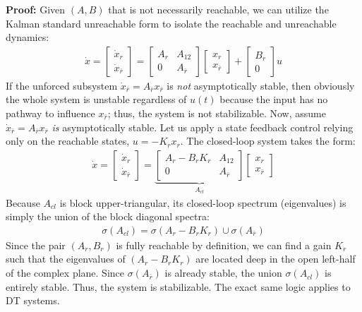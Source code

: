 \documentclass[twoside, 11pt, a4paper]{article}
\begin{document}
\textbf{Proof:} Given $(A,B)$ that is not necessarily reachable, we can utilize the Kalman standard unreachable form to isolate the reachable and unreachable dynamics:
%
\begin{align*}
\dot{x} = \left[ \begin{array}{c} \dot{x}_r \\ \dot{x}_{\bar{r}} \end{array} \right]  = \left[ \begin{array}{c|c} A_{r} & A_{12} \\ \hline 0 & A_{\bar{r}} \end{array} \right] \left[ \begin{array}{c} x_r \\ x_{\bar{r}} \end{array} \right]  
+ \left[ \begin{array}{c} B_r \\ 0 \end{array} \right] u
\end{align*}
%
If the unforced subsystem $\dot{x}_{\bar{r}} = A_{\bar{r}} x_{\bar{r}}$ is \textit{not} asymptotically stable, then obviously the whole system is unstable regardless of $u(t)$ because the input has no pathway to influence $x_{\bar{r}}$; thus, the system is not stabilizable.
%
Now, assume $\dot{x}_{\bar{r}} = A_{\bar{r}} x_{\bar{r}}$ \textit{is} asymptotically stable. Let us apply a state feedback control relying only on the reachable states, $u = - K_{r} x_{r}$. The closed-loop system takes the form:
%
\begin{align*}
\dot{x} = \left[ \begin{array}{c} \dot{x}_r \\ \dot{x}_{\bar{r}} \end{array} \right]  = \underbrace{\left[ \begin{array}{c|c} A_{r} - B_r K_r & A_{12} \\ \hline 0 & A_{\bar{r}} \end{array} \right]}_{A_{cl}} \left[ \begin{array}{c} x_r \\ x_{\bar{r}} \end{array} \right]  
\end{align*}
%
Because $A_{cl}$ is block upper-triangular, its closed-loop spectrum (eigenvalues) is simply the union of the block diagonal spectra:
\begin{align*}
    \sigma(A_{cl}) = \sigma(A_{r} - B_r K_r) \cup \sigma(A_{\bar{r}})
\end{align*}
Since the pair $(A_r,B_r)$ is fully reachable by definition, we can find a gain $K_r$ such that the eigenvalues of $(A_{r} - B_r K_r)$ are located deep in the open left-half of the complex plane. Since $\sigma(A_{\bar{r}})$ is already stable, the union $\sigma(A_{cl})$ is entirely stable. Thus, the system is stabilizable. The exact same logic applies to DT systems.

\end{document}
